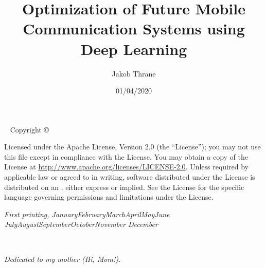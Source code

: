 \documentclass[nobib, b5paper]{tufte-book}
\title{Optimization of Future Mobile Communication Systems using Deep Learning}
\date{01/04/2020}
\author[Jakob Thrane]{Jakob Thrane}
\newcommand{\monthyear}{%
  \ifcase\month\or January\or February\or March\or April\or May\or June\or
  July\or August\or September\or October\or November\or
  December\fi\space\number\year
}
\newcommand{\blankpage}{\newpage\hbox{}\thispagestyle{empty}\newpage}
\begin{document}
\frontmatter





\newpage
\begin{fullwidth}
~\vfill
\thispagestyle{empty}
\setlength{\parindent}{0pt}
\setlength{\parskip}{\baselineskip}
Copyright \copyright\ \the\year\ \thanklessauthor

\par{}

\par{}

\par Licensed under the Apache License, Version 2.0 (the ``License''); you may not
use this file except in compliance with the License. You may obtain a copy
of the License at \url{http://www.apache.org/licenses/LICENSE-2.0}. Unless
required by applicable law or agreed to in writing, software distributed
under the License is distributed on an , either express or implied. See the
License for the specific language governing permissions and limitations
under the License.

\par\textit{First printing, \monthyear}
\end{fullwidth}





\printglossary[type=\acronymtype, nonumberlist, title=Acronyms]

\begin{fullwidth}
\tableofcontents
\end{fullwidth}


\cleardoublepage
~\vfill
\begin{doublespace}
\noindent\fontsize{18}{22}\selectfont\itshape
\nohyphenation
Dedicated to my mother (Hi, Mom!).
\end{doublespace}
\vfill
\vfill


\cleardoublepage



\mainmatter
\end{document}
